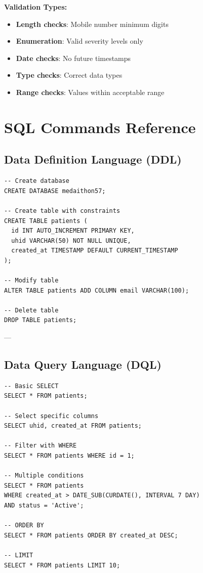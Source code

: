 \documentclass[12pt,a4paper]{article}
\begin{document}
\textbf{Validation Types:}
\begin{itemize}
    \item \textbf{Length checks}: Mobile number minimum digits
    \item \textbf{Enumeration}: Valid severity levels only
    \item \textbf{Date checks}: No future timestamps
    \item \textbf{Type checks}: Correct data types
    \item \textbf{Range checks}: Values within acceptable range
\end{itemize}

\section{SQL Commands Reference}

\subsection{Data Definition Language (DDL)}

\begin{lstlisting}[caption={DDL Commands}]
-- Create database
CREATE DATABASE medaithon57;

-- Create table with constraints
CREATE TABLE patients (
  id INT AUTO_INCREMENT PRIMARY KEY,
  uhid VARCHAR(50) NOT NULL UNIQUE,
  created_at TIMESTAMP DEFAULT CURRENT_TIMESTAMP
);

-- Modify table
ALTER TABLE patients ADD COLUMN email VARCHAR(100);

-- Delete table
DROP TABLE patients;
\end{lstlisting}

---

\subsection{Data Query Language (DQL)}

\begin{lstlisting}[caption={DQL Commands}]
-- Basic SELECT
SELECT * FROM patients;

-- Select specific columns
SELECT uhid, created_at FROM patients;

-- Filter with WHERE
SELECT * FROM patients WHERE id = 1;

-- Multiple conditions
SELECT * FROM patients 
WHERE created_at > DATE_SUB(CURDATE(), INTERVAL 7 DAY)
AND status = 'Active';

-- ORDER BY
SELECT * FROM patients ORDER BY created_at DESC;

-- LIMIT
SELECT * FROM patients LIMIT 10;
\end{lstlisting}
\end{document}
